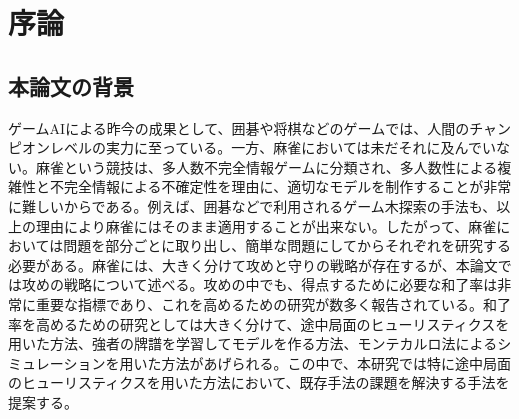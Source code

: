 \chapter{序論}
\label{chap:introduction}
\section{本論文の背景}
ゲームAIによる昨今の成果として、囲碁や将棋などのゲームでは、人間のチャンピオンレベルの実力に至っている。一方、麻雀においては未だそれに及んでいない。麻雀という競技は、多人数不完全情報ゲームに分類され、多人数性による複雑性と不完全情報による不確定性を理由に、適切なモデルを制作することが非常に難しいからである。例えば、囲碁などで利用されるゲーム木探索の手法も、以上の理由により麻雀にはそのまま適用することが出来ない。したがって、麻雀においては問題を部分ごとに取り出し、簡単な問題にしてからそれぞれを研究する必要がある。麻雀には、大きく分けて攻めと守りの戦略が存在するが、本論文では攻めの戦略について述べる。攻めの中でも、得点するために必要な和了率は非常に重要な指標であり、これを高めるための研究が数多く報告されている。和了率を高めるための研究としては大きく分けて、途中局面のヒューリスティクスを用いた方法、強者の牌譜を学習してモデルを作る方法、モンテカルロ法によるシミュレーションを用いた方法があげられる。この中で、本研究では特に途中局面のヒューリスティクスを用いた方法において、既存手法の課題を解決する手法を提案する。


